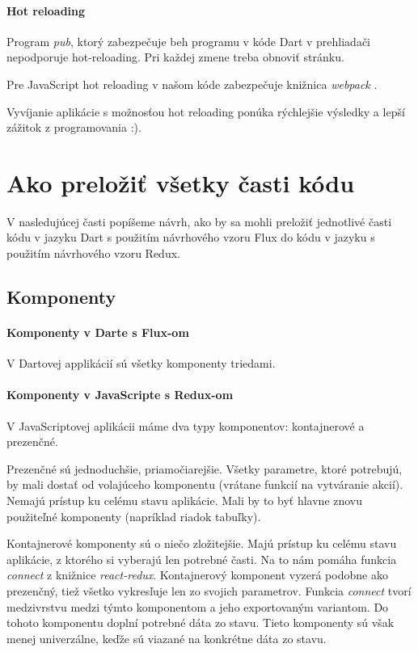 \paragraph{Hot reloading}%
\NEW{}
Program \emph{pub}, ktorý zabezpečuje beh programu v kóde Dart v prehliadači nepodporuje hot-reloading. Pri každej zmene treba obnoviť stránku.

Pre JavaScript hot reloading v našom kóde zabezpečuje knižnica \emph{webpack} \cite{webpack}.

Vyvíjanie aplikácie s možnosťou hot reloading ponúka rýchlejšie výsledky a lepší zážitok z programovania :).

\section{Ako preložiť všetky časti kódu}

\NEW{}
V nasledujúcej časti popíšeme návrh, ako by sa mohli preložiť jednotlivé časti kódu v jazyku Dart s použitím návrhového vzoru Flux do kódu v jazyku \JS{} s použitím návrhového vzoru Redux.

\subsection{Komponenty}

\paragraph{Komponenty v Darte s Flux-om}
V Dartovej applikácií sú všetky komponenty triedami.

\paragraph{Komponenty v JavaScripte s Redux-om}
V JavaScriptovej aplikácii máme dva typy komponentov: kontajnerové a prezenčné. 

Prezenčné sú jednoduchšie, priamočiarejšie. Všetky parametre, ktoré potrebujú, by mali dostať od volajúceho komponentu (vrátane funkcií na vytváranie akcií). Nemajú prístup ku celému stavu aplikácie. Mali by to byť hlavne znovu použiteľné komponenty (napríklad riadok tabuľky).

Kontajnerové komponenty sú o niečo zložitejšie. Majú prístup ku celému stavu aplikácie, z ktorého si vyberajú len potrebné časti. Na to nám pomáha funkcia \emph{connect} z knižnice \emph{react-redux}. Kontajnerový komponent vyzerá podobne ako prezenčný, tiež všetko vykresľuje len zo svojich parametrov. 
Funkcia \emph{connect} tvorí medzivrstvu medzi týmto komponentom a jeho exportovaným variantom. Do tohoto komponentu doplní potrebné dáta zo stavu. Tieto komponenty sú však menej univerzálne, keďže sú viazané na konkrétne dáta zo stavu.

